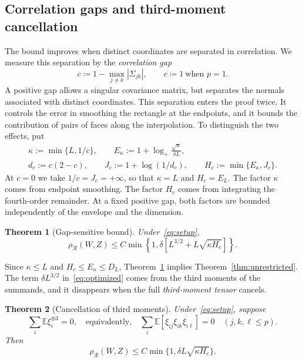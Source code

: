\documentclass[11pt,letterpaper]{article}
\newtheorem{theorem}{Theorem}
\theoremstyle{remark}
\newcommand{\E}{\mathbb E}
\newcommand{\rh}{\rho_{\mathcal R}}
\begin{document}
\subsection{Correlation gaps and third-moment cancellation}
The bound improves when distinct coordinates are separated in
correlation. We measure this separation by the \emph{correlation gap}
\[
 c\coloneqq 1-\max_{j\ne k}|\Sigma_{jk}|,
 \qquad c\coloneqq 1\ \text{when }p=1.
\]
A positive gap allows a singular covariance matrix, but separates the
normals associated with distinct coordinates. This separation enters the
proof twice. It controls the error in smoothing the rectangle at the
endpoints, and it bounds the contribution of pairs of faces along the
interpolation. To distinguish the two effects, put
\begin{equation}
 \begin{gathered}
 \kappa:=\min\{L,1/c\},\qquad
 E_\kappa:=1+\log_+\frac{\sqrt\kappa}{\delta L},\\
 d_c:=c(2-c),\qquad J_c:=1+\log(1/d_c),\qquad
 H_c:=\min\{E_\kappa,J_c\}.
 \end{gathered}
 \label{eq:parameters}
\end{equation}
At \(c=0\) we take \(1/c=J_c=+\infty\), so that \(\kappa=L\) and
\(H_c=E_L\). The factor \(\kappa\) comes from endpoint smoothing.
The factor \(H_c\) comes from integrating the fourth-order remainder.
At a fixed positive gap, both factors are bounded independently of the
envelope and the dimension.

\begin{theorem}[Gap-sensitive bound]\label{thm:optimized}
Under~\eqref{eq:setup},
\begin{equation}
 \rh(W,Z)\le C\min\!\left\{1,
 \delta[L^{3/2}+L\sqrt{\kappa H_c}]\right\}.
 \tag{R*}\label{eq:optimized}
\end{equation}
\end{theorem}

Since \(\kappa\le L\) and \(H_c\le E_\kappa\le D_L\),
Theorem~\ref{thm:optimized} implies Theorem~\ref{thm:unrestricted}.
The term \(\delta L^{3/2}\) in~\eqref{eq:optimized} comes from the
third moments of the summands,
and it disappears when the full \emph{third-moment tensor} cancels.

\begin{theorem}[Cancellation of third moments]\label{thm:zero-skew}
Under~\eqref{eq:setup}, suppose
\begin{equation}
 \sum_i\E\xi_i^{\otimes3}=0,
 \quad\text{equivalently,}\quad
 \sum_i\E[\xi_{ij}\xi_{ik}\xi_{i\ell}]=0
 \quad(j,k,\ell\le p).
 \label{eq:zero-third}
\end{equation}
Then
\begin{equation}
 \rh(W,Z)\le C\min\{1,\delta L\sqrt{\kappa H_c}\}.
 \tag{ZS}\label{eq:zero-skew}
\end{equation}
\end{theorem}
\end{document}
